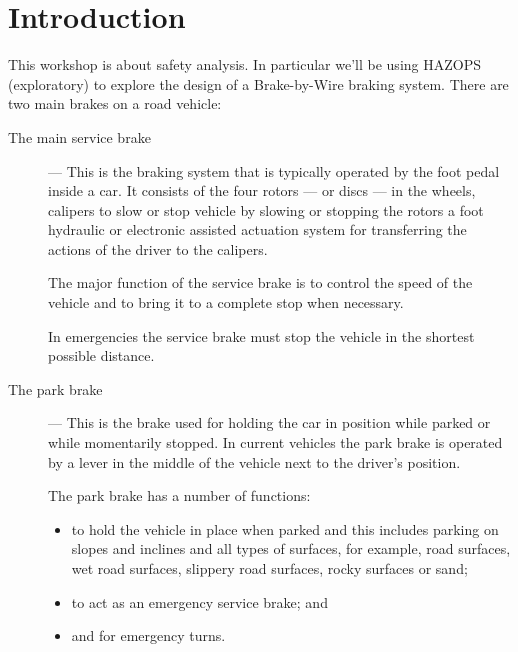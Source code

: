 \documentclass{article}
\begin{document}
%


\section*{Introduction}

This workshop is about safety analysis. In particular we'll be using
HAZOPS (exploratory) to explore
the design of a Brake-by-Wire braking system. There are two main
brakes on a road vehicle:

\begin{description}

\item[The main service brake] --- This is the braking system that is
  typically operated by the foot pedal inside a car. It consists of
  the four rotors --- or discs --- in the wheels, calipers to slow or
  stop vehicle by slowing or stopping the rotors a foot hydraulic or
  electronic assisted actuation system for transferring the actions of
  the driver to the calipers.

  The major function of the service brake is to control the speed of
  the vehicle and to bring it to a complete stop when necessary.

  In emergencies the service brake must stop the vehicle in the
  shortest possible distance.

\item[The park brake] --- This is the brake used for holding the car
  in position while parked or while momentarily stopped. In current
  vehicles the park brake is operated by a lever in the middle of the
  vehicle next to the driver's position.

  The park brake has a number of functions:
  \begin{itemize}

  \item to hold the vehicle in place when parked and this includes
    parking on slopes and inclines and all types of surfaces, for
    example, road surfaces, wet road surfaces, slippery road surfaces,
    rocky surfaces or sand;

  \item to act as an emergency service brake; and 

  \item and for emergency turns. 

  \end{itemize}

\end{description}
\end{document}
